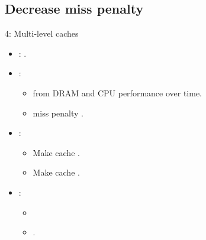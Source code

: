 \subsection{Decrease miss penalty}

\begin{frame}[t]{4: Multi-level caches}
\begin{itemize}
  \item {}: .

  \item {}:
    \begin{itemize} 
      \item {} from DRAM and CPU performance over time.
      \item {} miss penalty .
    \end{itemize}

  \item {}:
    \begin{itemize} 
      \item Make cache .
      \item Make cache .
    \end{itemize}

  \item {}:
    \begin{itemize}
      \item {}
      \item {}.
    \end{itemize}
\end{itemize}
\end{frame}

